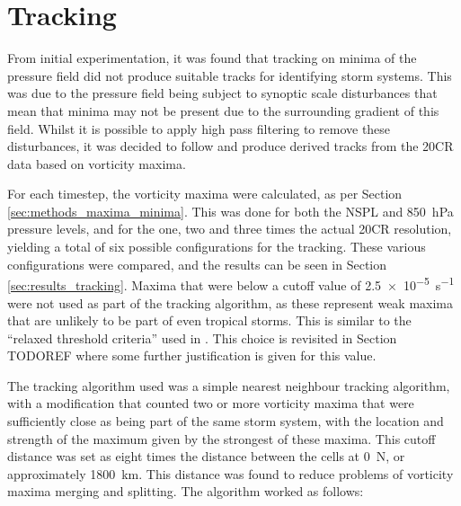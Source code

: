 \documentclass[pdftex,12pt,a4paper]{report}
\begin{document}
\section{Tracking}
\label{sec:tracking}

From initial experimentation, it was found that tracking on minima of the pressure field did not
produce suitable tracks for identifying storm systems. This was due to the pressure field being
subject to synoptic scale disturbances that mean that minima may not be present due to the
surrounding gradient of this field. Whilst it is possible to apply high pass filtering to remove
these disturbances, it was decided to follow \textcite{reed1988evaluation, thorncroft2001african}
and produce derived tracks from the 20CR data based on vorticity maxima.

For each timestep, the vorticity maxima were calculated, as per Section
\ref{sec:methods_maxima_minima}. This was done for both the NSPL and \SI{850}{hPa} pressure
levels, and for the one, two and three times the actual 20CR resolution, yielding a total of six
possible configurations for the tracking. These various configurations were compared, and the
results can be seen in Section \ref{sec:results_tracking}. Maxima that were below a cutoff value
of \SI{2.5e-5}{s^{-1}} were not used as part of the tracking algorithm, as these represent weak maxima
that are unlikely to be part of even tropical storms. This is similar to the ``relaxed threshold
criteria'' used in \textcite{camargo2002improving}. This choice is revisited in Section
TODOREF where some further justification is given for this value.

The tracking algorithm used was a simple nearest neighbour tracking algorithm, with a modification
that counted two or more vorticity maxima that were sufficiently close as being part of the same storm
system, with the location and strength of the maximum given by the strongest of
these maxima. This cutoff distance was set as eight times the distance between the cells at
0\textdegree\ N, or approximately \SI{1800}{km}. This distance was found to reduce problems of
vorticity maxima merging and splitting. The algorithm worked as follows:
\end{document}
